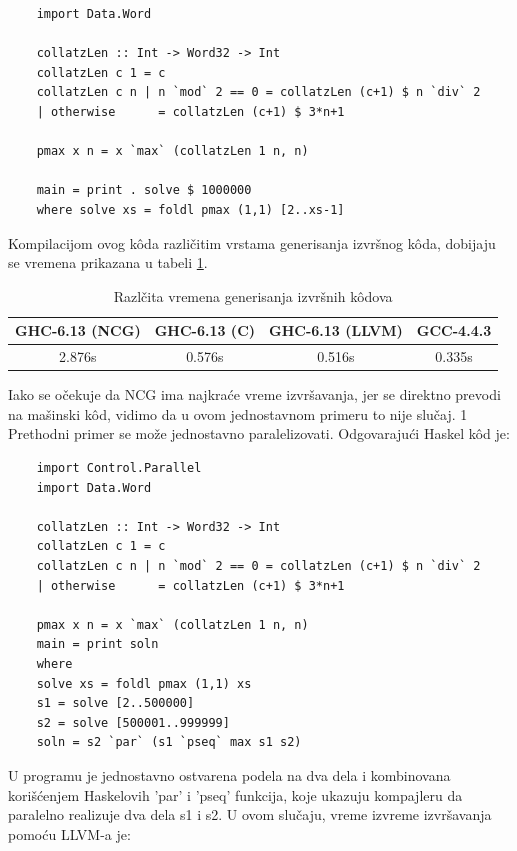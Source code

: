 \begin{verbatim}
	import Data.Word
	
	collatzLen :: Int -> Word32 -> Int
	collatzLen c 1 = c
	collatzLen c n | n `mod` 2 == 0 = collatzLen (c+1) $ n `div` 2
	| otherwise      = collatzLen (c+1) $ 3*n+1
	
	pmax x n = x `max` (collatzLen 1 n, n)
	
	main = print . solve $ 1000000
	where solve xs = foldl pmax (1,1) [2..xs-1]
\end{verbatim}

Kompilacijom ovog k\^{o}da različitim vrstama generisanja izvršnog k\^{o}da, dobijaju se vremena prikazana u tabeli \ref{tab:vremena}.

\begin{table}[h!]
	\begin{center}
		\caption{Razlčita vremena generisanja izvršnih k\^{o}dova}
		\begin{tabular}{||c|c|c|c||} \hline
			GHC-6.13 (NCG) & GHC-6.13 (C) & GHC-6.13 (LLVM) & GCC-4.4.3 \\ \hline
			2.876s & 0.576s & 0.516s & 0.335s \\ \hline
		\end{tabular}
		\label{tab:vremena}
	\end{center}
\end{table}


Iako se očekuje da NCG  ima najkraće vreme izvršavanja, jer se direktno prevodi na mašinski k\^{o}d, vidimo da u ovom jednostavnom primeru to nije slučaj. 1
Prethodni primer se može jednostavno paralelizovati. Odgovarajući Haskel k\^{o}d je:

\begin{verbatim}
	import Control.Parallel
	import Data.Word
	
	collatzLen :: Int -> Word32 -> Int
	collatzLen c 1 = c
	collatzLen c n | n `mod` 2 == 0 = collatzLen (c+1) $ n `div` 2
	| otherwise      = collatzLen (c+1) $ 3*n+1
	
	pmax x n = x `max` (collatzLen 1 n, n)
	main = print soln
	where
	solve xs = foldl pmax (1,1) xs
	s1 = solve [2..500000]
	s2 = solve [500001..999999]
	soln = s2 `par` (s1 `pseq` max s1 s2)
\end{verbatim}

U programu je jednostavno ostvarena podela na dva dela i kombinovana korišćenjem Haskelovih 'par' i 'pseq' funkcija, koje ukazuju kompajleru da paralelno realizuje dva dela s1 i s2. U ovom slučaju, vreme izvreme izvršavanja pomoću LLVM-a je:

